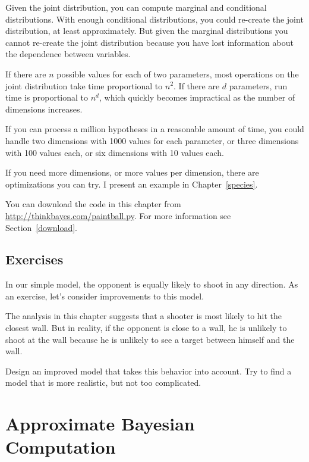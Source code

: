 \documentclass[12pt]{book}
\begin{document}
Given the joint distribution, you can compute marginal and conditional
distributions.  With enough conditional distributions, you could
re-create the joint distribution, at least approximately.  But given
the marginal distributions you cannot re-create the joint distribution
because you have lost information about the dependence between
variables.

If there are $n$ possible values for each of two parameters, most
operations on the joint distribution take time proportional to $n^2$.
If there are $d$ parameters, run time is proportional to $n^d$,
which quickly becomes impractical as the number of dimensions increases.

If you can process a million hypotheses in a reasonable amount of time,
you could handle two dimensions with 1000 values for each parameter,
or three dimensions with 100 values each, or six dimensions with 10
values each.

If you need more dimensions, or more values per dimension, there are
optimizations you can try.  I present an example
in Chapter~\ref{species}.

You can download the code in this chapter from
\url{http://thinkbayes.com/paintball.py}.
  For more information
see Section~\ref{download}.

\section{Exercises}

\begin{exercise}
In our simple model, the opponent is equally likely to shoot in any
direction.  As an exercise, let's consider improvements to this model.

The analysis in this chapter suggests that a shooter is most likely to
hit the closest wall.  But in reality, if the opponent is close to a
wall, he is unlikely to shoot at the wall because he is unlikely to
see a target between himself and the wall.

Design an improved model that takes this behavior
into account.  Try to find a model that is more realistic, but not
too complicated.
\end{exercise}





\chapter{Approximate Bayesian Computation}
\end{document}
